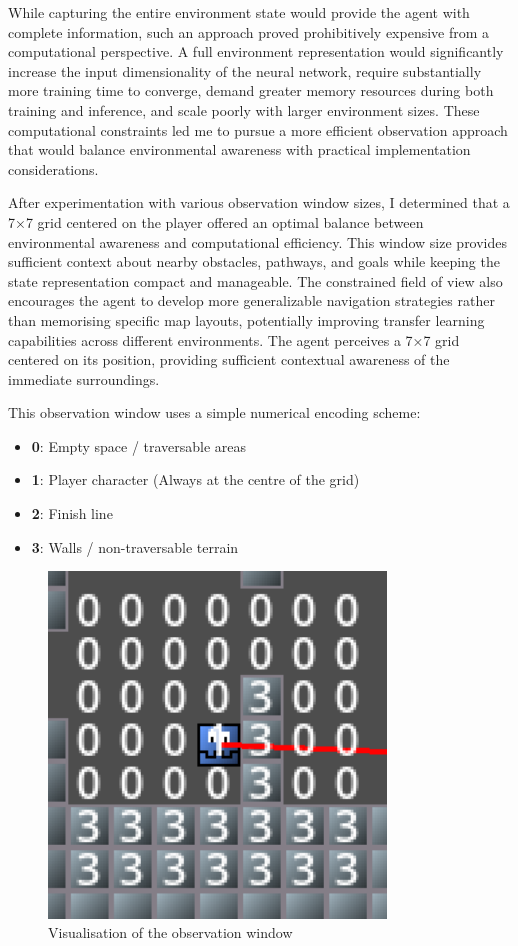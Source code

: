 While capturing the entire environment state would provide the agent with complete information, such an approach proved prohibitively expensive from a computational perspective. A full environment representation would
significantly increase the input dimensionality of the neural network, require substantially more training time to converge, demand greater memory resources during both training and inference, and scale poorly with larger environment sizes. 
These computational constraints led me to pursue a more efficient observation approach that would balance environmental awareness with practical implementation considerations.

After experimentation with various observation window sizes, I determined that a 7×7 grid centered on the player offered an optimal balance between environmental awareness and computational efficiency. 
This window size provides sufficient context about nearby obstacles, pathways, and goals while keeping the state representation compact and manageable. 
The constrained field of view also encourages the agent to develop more generalizable navigation strategies rather than memorising specific map layouts, potentially improving transfer learning capabilities across different environments.
The agent perceives a 7×7 grid centered on its position, providing sufficient contextual awareness of the immediate surroundings.

This observation window uses a simple numerical encoding scheme:
\begin{itemize}
    \item \textbf{0}: Empty space / traversable areas 
    \item \textbf{1}: Player character (Always at the centre of the grid)
    \item \textbf{2}: Finish line
    \item \textbf{3}: Walls / non-traversable terrain
\end{itemize}

\begin{figure}[H]
    \centering
    \includegraphics[width=0.8\textwidth]{figures/observation_window}
    \caption{Visualisation of the observation window}
    \label{fig:observation_window}
\end{figure}

